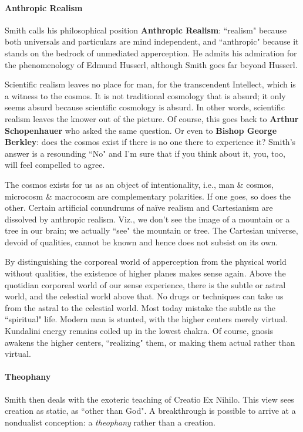\paragraph{Anthropic Realism}
Smith calls his philosophical position \textbf{Anthropic Realism}: ``realism" because both universals and particulars are mind independent, and ``anthropic" because it stands on the bedrock of unmediated apperception. He admits his admiration for the phenomenology of Edmund Husserl, although Smith goes far beyond Husserl.

Scientific realism leaves no place for man, for the transcendent Intellect, which is a witness to the cosmos. It is not traditional cosmology that is absurd; it only seems absurd because scientific cosmology is absurd. In other words, scientific realism leaves the knower out of the picture. Of course, this goes back to \textbf{Arthur Schopenhauer} who asked the same question. Or even to \textbf{Bishop George Berkley}: does the cosmos exist if there is no one there to experience it? Smith's answer is a resounding ``No" and I'm sure that if you think about it, you, too, will feel compelled to agree.

The cosmos exists for us as an object of intentionality, i.e., man \& cosmos, microcosm \& macrocosm are complementary polarities. If one goes, so does the other. Certain artificial conundrums of naïve realism and Cartesianism are dissolved by anthropic realism. Viz., we don't see the image of a mountain or a tree in our brain; we actually ``see" the mountain or tree. The Cartesian universe, devoid of qualities, cannot be known and hence does not subsist on its own.

By distinguishing the corporeal world of apperception from the physical world without qualities, the existence of higher planes makes sense again. Above the quotidian corporeal world of our sense experience, there is the subtle or astral world, and the celestial world above that. No drugs or techniques can take us from the astral to the celestial world. Most today mistake the subtle as the ``spiritual" life. Modern man is stunted, with the higher centers merely virtual. Kundalini energy remains coiled up in the lowest chakra. Of course, gnosis awakens the higher centers, ``realizing" them, or making them actual rather than virtual.

\paragraph{Theophany}
Smith then deals with the exoteric teaching of Creatio Ex Nihilo. This view sees creation as static, as ``other than God". A breakthrough is possible to arrive at a nondualist conception: a \emph{theophany} rather than a creation.

